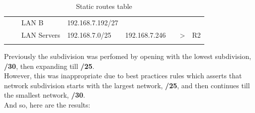 \documentclass[11pt,a4paper]{report}
\begin{document}
\begin{longtable}[c]{@{}lllllclc@{}}
                            &                                & LAN B       & 192.168.7.192/27 & \multicolumn{1}{c}{}                               &                     &                                 &                     \\* \cmidrule(lr){3-5} \cmidrule(l){7-8}
                            &                                & LAN Servers & 192.168.7.0/25   & 192.168.7.246                                      &                     & \textgreater{}                  & R2                  \\* \bottomrule
        \caption{Static routes table}
        \label{tab:staticroutetbl}\\
    \end{longtable}
    
    Previously the subdivision was perfomed by opening with the lowest subdivision, \textbf{/30}, then expanding till \textbf{/25}. \\
    However, this was inappropriate due to best practices rules which asserts that network subdivision starts with the largest network, \textbf{/25}, and then continues till the smallest network, \textbf{/30}. \\
    And so, here are the results:\\
\end{document}
